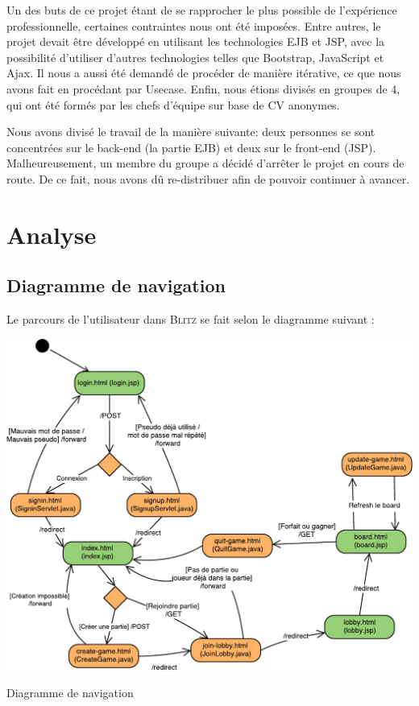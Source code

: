 \documentclass[11pt]{scrreprt}
\begin{document}
    Un des buts de ce projet étant de se rapprocher le plus possible de l'expérience professionnelle, certaines contraintes nous ont été imposées. Entre autres, le projet devait être développé en utilisant les technologies EJB et JSP, avec la possibilité d'utiliser d'autres technologies telles que Bootstrap, JavaScript et Ajax. Il nous a aussi été demandé de procéder de manière itérative, ce que nous avons fait en procédant par Usecase. Enfin, nous étions divisés en groupes de 4, qui ont été formés par les chefs d'équipe sur base de CV anonymes.

    Nous avons divisé le travail de la manière suivante: deux personnes se sont concentrées sur le back-end (la partie EJB) et deux sur le front-end (JSP). Malheureusement, un membre du groupe a décidé d'arrêter le projet en cours de route. De ce fait, nous avons dû re-distribuer afin de pouvoir continuer à avancer.

    \chapter{Analyse}
    \section{Diagramme de navigation}
    Le parcours de l'utilisateur dans \textsc{Blitz} se fait selon le diagramme suivant :

    \begin{table}[H]
        \centering
        \includegraphics[width=\textwidth]{images/diag-nav.pdf}
        \caption{Diagramme de navigation}
    \end{table}
\end{document}

